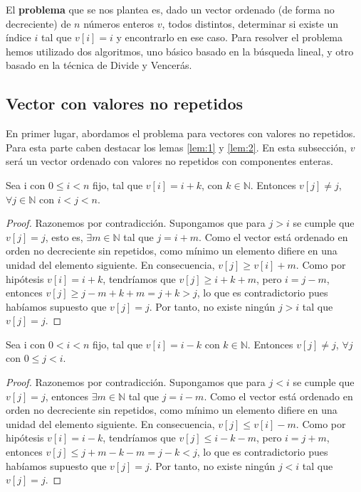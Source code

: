 El \textbf{problema} que se nos plantea es, dado un vector ordenado (de forma no decreciente) de $n$ números enteros $v$, todos 
distintos, determinar si existe un índice $i$ tal que $v[i] = i$ y 
encontrarlo en ese caso. Para resolver el problema hemos utilizado dos algoritmos, uno básico basado en 
la búsqueda lineal, y otro basado en la técnica de Divide y Vencerás. 

\subsection{Vector con valores no repetidos}

En primer lugar, abordamos el problema para vectores con valores no repetidos. Para esta parte
caben destacar los lemas \ref{lem:1} y \ref{lem:2}. En esta subsección, $v$ será un vector ordenado con
valores no repetidos con componentes enteras. 


\begin{lemma}
    \label{lem:1}
    Sea i con $0 \leqslant i < n$ fijo, tal que $v[i]=i+k$, con $k \in \mathbb N$. 
    Entonces $v[j] \neq j$, $\forall j \in \mathbb N$ con $i < j < n$. 
\end{lemma}

\begin{proof}
    Razonemos por contradicción. Supongamos que para $j > i$ se 
    cumple que $v[j]=j$, esto es, $\exists m \in \mathbb N$ tal que $j=i+m$. Como el 
    vector está ordenado en orden no decreciente sin repetidos, como mínimo un elemento
    difiere en una unidad del elemento siguiente. En consecuencia,  $v[j] \geq v[i]+m$. 
    Como por hipótesis $v[i]=i+k$, tendríamos que $v[j] \geq i+k+m$, pero $i=j-m$, entonces 
    $v[j] \geq j-m+k+m=j+k > j$, lo que es contradictorio pues habíamos supuesto que $v[j]=j$. Por tanto, no 
    existe ningún $j > i$ tal que $v[j]=j$.
\end{proof}

\begin{lemma}
    \label{lem:2}
    Sea i con $0 < i < n$ fijo, tal que $v[i]=i-k$ con 
    $k \in \mathbb N$. Entonces $v[j] \neq j$,  $\forall j$ con $0 \leqslant j < i$. 
\end{lemma}

\begin{proof}
    Razonemos por contradicción. Supongamos que para $j < i$ se 
    cumple que $v[j]=j$, entonces $\exists m \in \mathbb N$ tal que $j=i-m$. Como el 
    vector está ordenado en orden no decreciente sin repetidos, como mínimo un elemento
    difiere en una unidad del elemento siguiente. En consecuencia,  $v[j] \leq v[i]-m$. 
    Como por hipótesis $v[i]=i-k$, tendríamos que $v[j] \leq i-k-m$, pero $i=j+m$, entonces 
    $v[j] \leq j+m-k-m=j-k < j$, lo que es contradictorio pues habíamos supuesto que $v[j]=j$. Por tanto, no 
    existe ningún $j<i$ tal que $v[j]=j$.
\end{proof}

